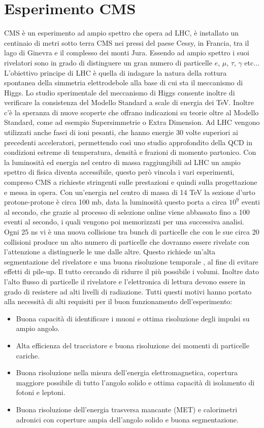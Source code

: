 \section{Esperimento CMS}
CMS è un esperimento ad ampio spettro che opera ad LHC, è installato un centinaio di metri sotto terra CMS nei pressi del paese Cessy, in Francia, tra il lago di Ginevra e il complesso dei monti Jura. Essendo ad ampio spettro i suoi rivelatori sono in grado di distinguere un gran numero di particelle $e$, $\mu$, $\tau$, $\gamma$ etc...
L'obiettivo principe di LHC è quella di indagare la natura della rottura spontanea della simmetria elettrodebole alla base di cui sta il meccanismo di Higgs. Lo studio sperimentale del meccanismo di Higgs consente inoltre di verificare la consistenza del Modello Standard a scale di energia dei TeV. Inoltre c'è la speranza di nuove scoperte che offrano indicazioni su teorie oltre al Modello Standard, come ad esempio Supersimmetrie o Extra Dimension.
Ad LHC vengono utilizzati anche fasci di ioni pesanti, che hanno energie 30 volte superiori ai precedenti acceleratori, permettendo così uno studio approfondito della QCD in condizioni estreme di temperatura, densità e frazioni di momento partonico. Con la luminosità ed energia nel centro di massa raggiungibili ad LHC un ampio spettro di fisica diventa accessibile, questo però vincola i vari esperimenti, compreso CMS a richieste stringenti sulle prestazioni e quindi sulla progettazione e messa in opera.
Con un'energia nel centro di massa di 14 TeV la sezione d'urto protone-protone è circa 100 mb, data la  luminosità questo porta a circa $10^9$ eventi al secondo, che grazie al processo di selezione online viene abbassato fino a 100 eventi al secondo, i quali vengono poi memorizzati per una successiva analisi. 
Ogni 25 ns vi è una nuova collisione tra bunch di particelle che con le sue circa 20 collisioni produce un alto numero di particelle che dovranno essere rivelate con l'attenzione a distinguerle le une dalle altre. Questo richiede un'alta segmentazione del rivelatore e una buona risoluzione temporale , al fine di evitare effetti di pile-up. Il tutto cercando di ridurre il più possibile i volumi.
Inoltre dato l'alto flusso di particelle il rivelatore e l'elettronica di lettura devono essere in grado di resistere ad alti livelli di radiazione. Tutti questi motivi hanno  portato alla necessità di alti requisiti per il buon funzionamento dell'esperimento:
\begin{itemize}
\item Buona capacità di identificare i muoni e ottima risoluzione degli impulsi su ampio angolo.
\item Alta efficienza del tracciatore e buona risoluzione dei momenti di particelle cariche.
\item Buona risoluzione nella misura dell'energia elettromagnetica, copertura maggiore possibile di tutto l'angolo solido e ottima capacità di isolamento di fotoni e leptoni.
\item Buona risoluzione dell'energia trasversa mancante (MET) e calorimetri adronici con coperture ampia dell'angolo solido e buona segmentazione.
\end{itemize}

